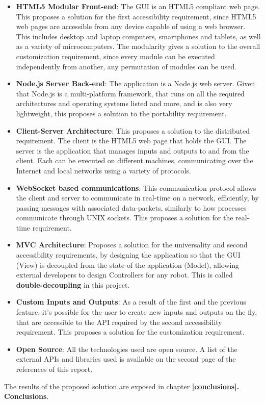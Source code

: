 \begin{itemize}
	\item \textbf{HTML5 Modular Front-end}: The GUI is an HTML5 compliant web page. This proposes a solution for the first 
	accessibility requirement, since HTML5 web pages are accessible from any device capable of using a web browser. This 
	includes desktop and laptop computers, smartphones and tablets, as well as a variety of microcomputers. The modularity 
	gives a solution to the overall customization requirement, since every module can be executed independently from 
	another, any permutation of modules can be used.
	\item \textbf{Node.js Server Back-end}: The application is a Node.js web server. Given that Node.js is a multi-platform 
	framework, that runs on all the required architectures and operating systems listed and more, and is also very 
	lightweight, this proposes a solution to the portability requirement.
	\item \textbf{Client-Server Architecture}: This proposes a solution to the distributed requirement. The client is the 
	HTML5 web page that holds the GUI. The server is the application that manages inputs and outputs to and from the client. 
	Each can be executed on different machines, communicating over the Internet and local networks using a variety of 
	protocols.
	\item \textbf{WebSocket based communications}: This communication protocol allows the client and server to communicate 
	in real-time on a network, efficiently, by passing messages with associated data-packets, similarly to how processes 
	communicate through UNIX sockets. This proposes a solution for the real-time requirement.
	\item \textbf{MVC Architecture}: Proposes a solution for the universality and second accessibility requirements, by 
	designing the application so that the GUI (View) is decoupled from the state of the application (Model), allowing 
	external developers to design Controllers for any robot. This is called \textbf{double-decoupling} in this project.	
	\item \textbf{Custom Inputs and Outputs}: As a result of the first and the previous feature, it's possible for the user 
	to create new inputs and outputs on the fly, that are accessible to the API required by the second accessibility 
	requirement. This proposes a solution for the customization requirement.
	\item \textbf{Open Source}: All the technologies used are open source. A list of the external APIs and libraries used is 
	available on the second page of the references of this report.
\end{itemize}
The results of the proposed solution are exposed in chapter \textbf{\ref{conclusions}. Conclusions}.\\

